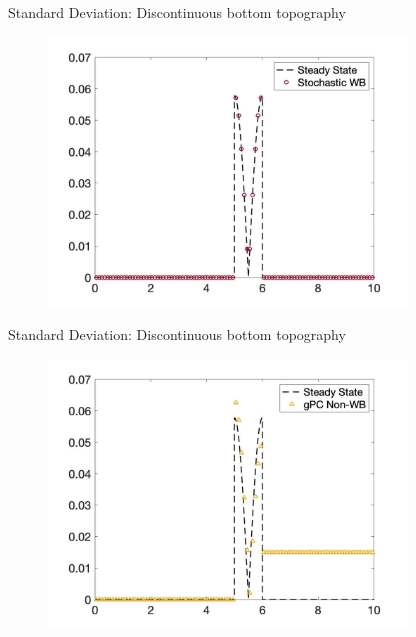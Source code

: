 \documentclass[
    pdf,
    11pt,
    xcolor={svgnames},
  ]{beamer}
\begin{document}
\begin{frame}{Standard Deviation: Discontinuous bottom topography}
    \begin{figure}
    \centering
    \includegraphics[width=0.85\textwidth]{./Figures/burgers_dis_wb_sd}
    \end{figure}
\end{frame}
\begin{frame}{Standard Deviation: Discontinuous bottom topography}
    \begin{figure}
    \centering
    \includegraphics[width=0.85\textwidth]{./Figures/burgers_dis_non_sd}
    \end{figure}
\end{frame}
\end{document}
